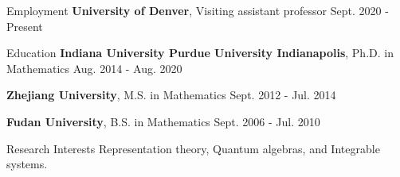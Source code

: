 \documentclass{resume} %
\begin{document}
\begin{rSection}{Employment}
{\bf University of Denver}, Visiting assistant professor \hfill {Sept. 2020 - Present}
\end{rSection}

\begin{rSection}{Education}
{\bf Indiana University Purdue University Indianapolis}, Ph.D. in Mathematics \hfill {Aug. 2014 - Aug. 2020}

{\bf Zhejiang University}, M.S. in Mathematics \hfill {Sept. 2012 - Jul. 2014}

{\bf Fudan University}, B.S. in Mathematics \hfill {Sept. 2006 - Jul. 2010}
\end{rSection}

\begin{rSection}{Research Interests}
Representation theory, Quantum algebras, and Integrable systems.  
\end{rSection}






\end{document}
